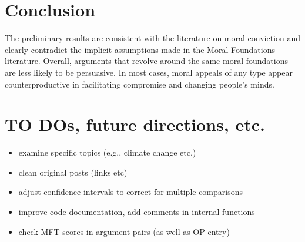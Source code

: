 \documentclass[12pt,]{article}
\providecommand{\tightlist}{%
\setlength{\itemsep}{0pt}\setlength{\parskip}{0pt}}
\begin{document}
\clearpage

\section{Conclusion}\label{conclusion}

The preliminary results are consistent with the literature on moral
conviction and clearly contradict the implicit assumptions made in the
Moral Foundations literature. Overall, arguments that revolve around the
same moral foundations are less likely to be persuasive. In most cases,
moral appeals of any type appear counterproductive in facilitating
compromise and changing people's minds.

\section{TO DOs, future directions,
etc.}\label{to-dos-future-directions-etc.}

\begin{itemize}
\tightlist
\item
  examine specific topics (e.g., climate change etc.)
\item
  clean original posts (links etc)
\item
  adjust confidence intervals to correct for multiple comparisons
\item
  improve code documentation, add comments in internal functions
\item
  check MFT scores in argument pairs (as well as OP entry)
\end{itemize}




\newpage
\singlespacing 

\end{document}

